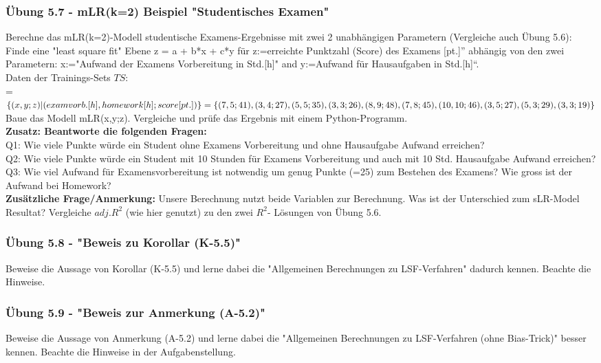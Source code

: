 \documentclass[12pt]{article}
\begin{document}
\subsubsection{Übung 5.7 - mLR(k=2) Beispiel "Studentisches Examen"}
%
Berechne das  mLR(k=2)-Modell studentische Examens-Ergebnisse mit zwei 2 unabhängigen Parametern (Vergleiche auch Übung 5.6):\\  
Finde eine "least square fit" Ebene  z = a + b*x + c*y für z:=erreichte Punktzahl (Score) des Examens [pt.]” abhängig von den zwei Parametern: x:="Aufwand der Examens Vorbereitung in Std.[h]" and y:=Aufwand für Hausaufgaben in Std.[h]“.\\[0.2cm]
Daten der Trainings-Sets $TS$: \\
= $ \lbrace (x, y; z) | (exam vorb.[h], homework[h]; score[pt.])\rbrace = \lbrace(7,5;41 ),(3,4;27), \\
(5,5;35), (3,3;26), (8,9;48), (7,8;45), (10,10;46), (3,5;27), (5,3;29), (3,3;19)\rbrace $ \\[0.2cm]
Baue das Modell mLR(x,y;z). Vergleiche und prüfe das Ergebnis mit einem Python-Programm.\\[0.2cm]
\textbf{Zusatz: Beantworte die folgenden Fragen:}\\ 
Q1: Wie viele Punkte würde ein Student ohne Examens Vorbereitung und ohne Hausaufgabe Aufwand erreichen? \\
Q2: Wie viele Punkte würde ein Student mit 10 Stunden für Examens Vorbereitung und auch mit 10 Std. Hausaufgabe Aufwand erreichen? \\ 
Q3: Wie viel Aufwand für Examensvorbereitung ist notwendig um genug Punkte (=25) zum Bestehen des Examens? Wie gross ist der Aufwand bei Homework?\\[0.2cm]
\textbf{Zusätzliche Frage/Anmerkung:} Unsere Berechnung nutzt beide Variablen zur Berechnung. Was ist der Unterschied zum sLR-Model Resultat? Vergleiche $adj.R^2$ (wie hier genutzt) zu den zwei $R^2$- Lösungen von Übung 5.6.\\


\subsubsection{Übung 5.8 - "Beweis zu Korollar (K-5.5)"}
%
Beweise die Aussage von Korollar (K-5.5) und lerne dabei die "Allgemeinen Berechnungen zu LSF-Verfahren" dadurch kennen. Beachte die Hinweise. 


\subsubsection{Übung 5.9 - "Beweis zur Anmerkung (A-5.2)"}
%
Beweise die Aussage von Anmerkung (A-5.2) und lerne dabei die "Allgemeinen Berechnungen zu LSF-Verfahren (ohne Bias-Trick)" besser kennen. Beachte die Hinweise in der Aufgabenstellung. 
\end{document}
